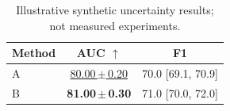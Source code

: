 \documentclass[10pt]{article}
\begin{document}
\begin{table}[t]
\centering
\caption{Illustrative synthetic uncertainty results; not measured experiments.}
\label{tab:uncertainty}
\begin{tabular}{@{}lcc@{}}
\toprule
Method & AUC $\uparrow$ & F1 \\
\midrule
A & \underline{80.00\,$\pm$\,0.20} & 70.0 [69.1, 70.9] \\
B & \textbf{81.00\,$\pm$\,0.30} & 71.0 [70.0, 72.0] \\
\bottomrule
\end{tabular}
\end{table}
\end{document}
